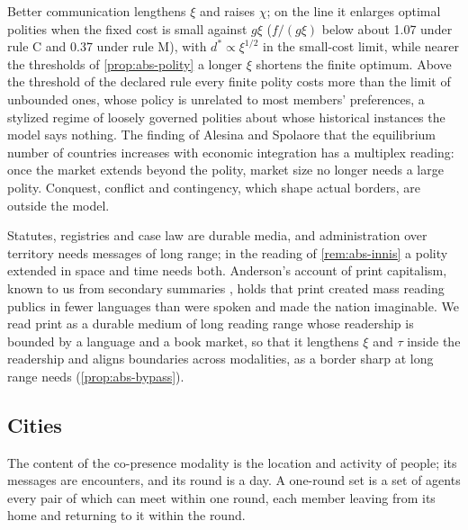 \begin{remark}\label{rem:abs-polity-readings}
Better communication lengthens $\xi$ and raises $\chi$; on the line it enlarges optimal polities when the fixed cost is small against $g\xi$ ($f/(g\xi)$ below about 1.07 under rule C and 0.37 under rule M), with $d^\ast\propto\xi^{1/2}$ in the small-cost limit, while nearer the thresholds of \cref{prop:abs-polity} a longer $\xi$ shortens the finite optimum. Above the threshold of the declared rule every finite polity costs more than the limit of unbounded ones, whose policy is unrelated to most members' preferences, a stylized regime of loosely governed polities about whose historical instances the model says nothing. The finding of Alesina and Spolaore that the equilibrium number of countries increases with economic integration has a multiplex reading: once the market extends beyond the polity, market size no longer needs a large polity. Conquest, conflict and contingency, which shape actual borders, are outside the model.
\end{remark}

Statutes, registries and case law are durable media, and administration over territory needs messages of long range; in the reading of \cref{rem:abs-innis} a polity extended in space and time needs both. Anderson's account of print capitalism, known to us from secondary summaries \citep{anderson1983imagined}, holds that print created mass reading publics in fewer languages than were spoken and made the nation imaginable. We read print as a durable medium of long reading range whose readership is bounded by a language and a book market, so that it lengthens $\xi$ and $\tau$ inside the readership and aligns boundaries across modalities, as a border sharp at long range needs (\cref{prop:abs-bypass}).

\subsection{Cities}\label{sec:abs-cities}

\begin{definition}\label{def:abs-one-round}
The content of the co-presence modality is the location and activity of people; its messages are encounters, and its round is a day. A one-round set is a set of agents every pair of which can meet within one round, each member leaving from its home and returning to it within the round.
\end{definition}

